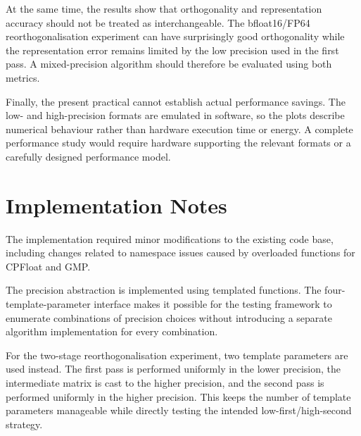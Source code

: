 \documentclass[a4paper,11pt]{article}
\begin{document}
At the same time, the results show that orthogonality and representation
accuracy should not be treated as interchangeable. The bfloat16/FP64
reorthogonalisation experiment can have surprisingly good orthogonality while
the representation error remains limited by the low precision used in the
first pass. A mixed-precision algorithm should therefore be evaluated using
both metrics.

Finally, the present practical cannot establish actual performance savings.
The low- and high-precision formats are emulated in software, so the plots
describe numerical behaviour rather than hardware execution time or energy.
A complete performance study would require hardware supporting the relevant
formats or a carefully designed performance model.

\appendix
\section{Implementation Notes}

The implementation required minor modifications to the existing code base,
including changes related to namespace issues caused by overloaded functions
for CPFloat and GMP.

The precision abstraction is implemented using templated functions. The
four-template-parameter interface makes it possible for the testing
framework to enumerate combinations of precision choices without introducing
a separate algorithm implementation for every combination.

For the two-stage reorthogonalisation experiment, two template parameters are
used instead. The first pass is performed uniformly in the lower precision,
the intermediate matrix is cast to the higher precision, and the second pass
is performed uniformly in the higher precision. This keeps the number of
template parameters manageable while directly testing the intended
low-first/high-second strategy.
\end{document}
